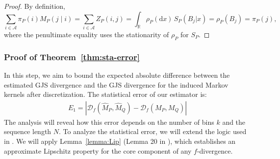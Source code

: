 \documentclass{article}
\theoremstyle{plain}
\theoremstyle{definition}
\theoremstyle{remark}
\begin{document}
\begin{proof}
By definition,
\[
\sum_{i\in\mathcal A}\pi_P(i)M_P(j\mid i)
=\sum_{i\in\mathcal A}Z_P(i,j)
=\int_{\mathbb{R}}\rho_P(\mathrm{d}x)\,S_P(B_j|x)
=\rho_P(B_j)
=\pi_P(j),
\]
where the penultimate equality uses the stationarity of $\rho_P$ for $S_P$.
\end{proof}
\subsubsection{Proof of Theorem~\ref{thm:sta-error}} \label{sec:proof-sta-error}
In this step, we aim to bound the expected absolute difference between the estimated GJS divergence and the GJS divergence for the induced Markov kernels after discretization. The statistical error of our estimator is:
\begin{align}
    E_1 =  |\mathcal{D}_f(\hat M_P, \hat M_Q)-\mathcal{D}_f(M_P,M_Q)|
\end{align}
 The analysis will reveal how this error depends on the number of bins $k$ and the sequence length $N$. To analyze the statistical error, we will extend the logic used in  \citet{pillutla2023mauvescoresgenerativemodels}. We will apply Lemma~\ref{lemma:Lip} (Lemma 20 in  \citet{pillutla2023mauvescoresgenerativemodels}), which establishes an approximate Lipschitz property for the core component of any $f$-divergence. 
\end{document}
